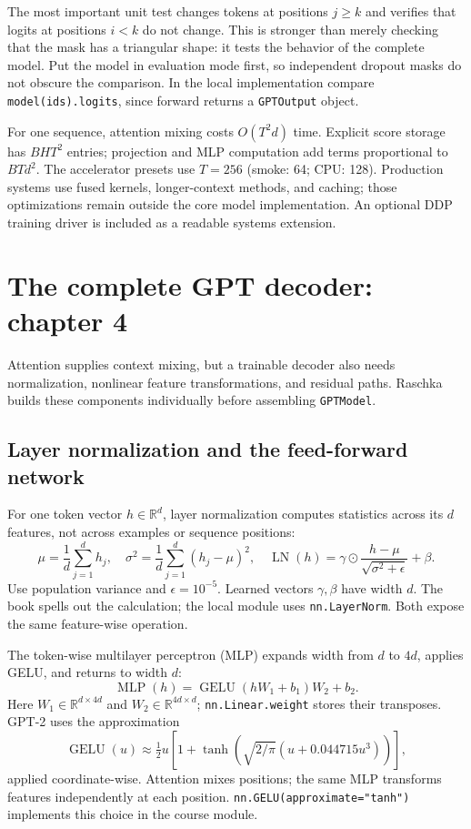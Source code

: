 \documentclass[11pt]{article}
\begin{document}
The most important unit test changes tokens at positions $j\ge k$ and verifies
that logits at positions $i<k$ do not change. This is stronger than merely
checking that the mask has a triangular shape: it tests the behavior of the
complete model. Put the model in evaluation mode first, so independent dropout
masks do not obscure the comparison. In the local implementation compare
\texttt{model(ids).logits}, since forward returns a \texttt{GPTOutput} object.

For one sequence, attention mixing costs $O(T^2d)$ time. Explicit score storage
has $BHT^2$ entries; projection and MLP computation add terms proportional to
$BTd^2$. The accelerator presets use $T=256$ (smoke: 64; CPU: 128).
Production systems use
fused kernels, longer-context methods, and caching; those
optimizations remain outside the core model implementation. An optional DDP
training driver is included as a readable systems extension.

\section{The complete GPT decoder: chapter 4}
\label{sec:decoder}

Attention supplies context mixing, but a trainable decoder also needs
normalization, nonlinear feature transformations, and residual paths. Raschka
builds these components individually before assembling \texttt{GPTModel}.

\subsection{Layer normalization and the feed-forward network}
For one token vector $h\in\mathbb R^d$, layer normalization computes statistics
across its $d$ features, not across examples or sequence positions:
\[
\mu=\frac1d\sum_{j=1}^d h_j,\quad
\sigma^2=\frac1d\sum_{j=1}^d(h_j-\mu)^2,\quad
\operatorname{LN}(h)=\gamma\odot\frac{h-\mu}{\sqrt{\sigma^2+\epsilon}}+\beta.
\]
Use population variance and $\epsilon=10^{-5}$. Learned vectors $\gamma,\beta$
have width $d$. The book spells out the calculation; the local module uses
\texttt{nn.LayerNorm}. Both expose the same feature-wise operation.

The token-wise multilayer perceptron (MLP) expands width from $d$ to $4d$, applies
GELU, and returns to width $d$:
\[
\operatorname{MLP}(h)=\operatorname{GELU}(hW_1+b_1)W_2+b_2.
\]
Here $W_1\in\mathbb R^{d\times4d}$ and $W_2\in\mathbb R^{4d\times d}$;
\texttt{nn.Linear.weight} stores their transposes. GPT-2 uses the approximation
\[
\operatorname{GELU}(u)\approx\tfrac12u\left[1+\tanh\left(
\sqrt{2/\pi}(u+0.044715u^3)\right)\right],
\]
applied coordinate-wise. Attention mixes positions; the same MLP transforms
features independently at each position. \texttt{nn.GELU(approximate="tanh")}
implements this choice in the course module.
\end{document}

